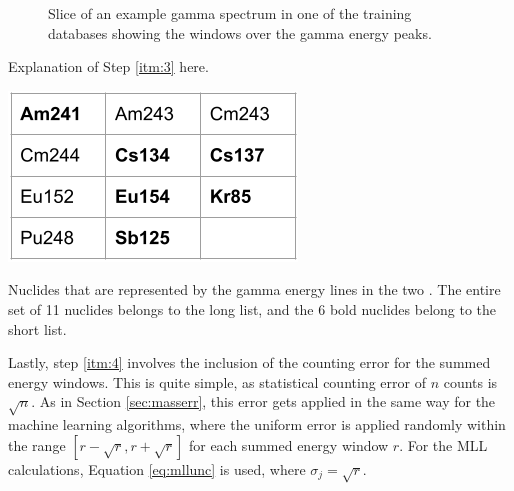 \begin{figure}[!htb]
  \caption{Slice of an example gamma spectrum in one of the training databases
           showing the windows over the gamma energy peaks.}
  \label{fig:enwindows}
\end{figure}

Explanation of Step \ref{itm:3} here. 

\begin{table}[!htb]
  \centering
  \includegraphics[width=0.4\linewidth]{./chapters/method/enlist_nucs.png}
  \caption{Nuclides that are represented by the gamma energy lines in the two . The entire 
           set of 11 nuclides belongs to the long list, and the 6 bold nuclides
           belong to the short list.}
  \label{tbl:enlistnucs}
\end{table}

Lastly, step \ref{itm:4} involves the inclusion of the counting error for the
summed energy windows. This is quite simple, as statistical counting error of
$n$ counts is $\sqrt{n}$.  As in Section \ref{sec:masserr}, this error gets
applied in the same way for the machine learning algorithms, where the uniform
error is applied randomly within the range $[r-\sqrt{r},r+\sqrt{r}]$ for each
summed energy window $r$. For the \gls{MLL} calculations, Equation
\ref{eq:mllunc} is used, where $\sigma_{j} = \sqrt{r}$.  
